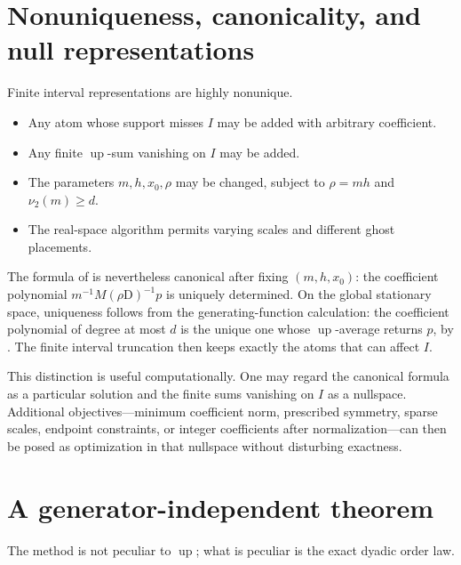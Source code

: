 \documentclass[11pt,oneside]{article}
\theoremstyle{definition}
\theoremstyle{remark}
\newcommand{\Up}{\operatorname{up}}
\newcommand{\vtwo}{\nu_2}
\newcommand{\D}{\mathrm D}
\begin{document}
\section{Nonuniqueness, canonicality, and null representations}
\label{sec:nonuniqueness}

Finite interval representations are highly nonunique.

\begin{itemize}
  \item Any atom whose support misses \(I\) may be added with arbitrary
        coefficient.
  \item Any finite \(\Up\)-sum vanishing on \(I\) may be added.
  \item The parameters \(m,h,x_0,\rho\) may be changed, subject to
        \(\rho=mh\) and \(\vtwo(m)\ge d\).
  \item The real-space algorithm permits varying scales and different ghost
        placements.
\end{itemize}

The formula of  is nevertheless canonical after fixing
\((m,h,x_0)\): the coefficient polynomial
\(m^{-1}M(\rho\D)^{-1}p\) is uniquely determined.  On the global stationary
space, uniqueness follows from the generating-function calculation: the
coefficient polynomial of degree at most \(d\) is the unique one whose
\(\Up\)-average returns \(p\), by .  The
finite interval truncation then keeps exactly the atoms that can affect \(I\).

This distinction is useful computationally.  One may regard the canonical
formula as a particular solution and the finite sums vanishing on \(I\) as a
nullspace.  Additional objectives---minimum coefficient norm, prescribed
symmetry, sparse scales, endpoint constraints, or integer coefficients after
normalization---can then be posed as optimization in that nullspace without
disturbing exactness.

\section{A generator-independent theorem}
\label{sec:general-generator}

The method is not peculiar to \(\Up\); what is peculiar is the exact dyadic
order law.
\end{document}
